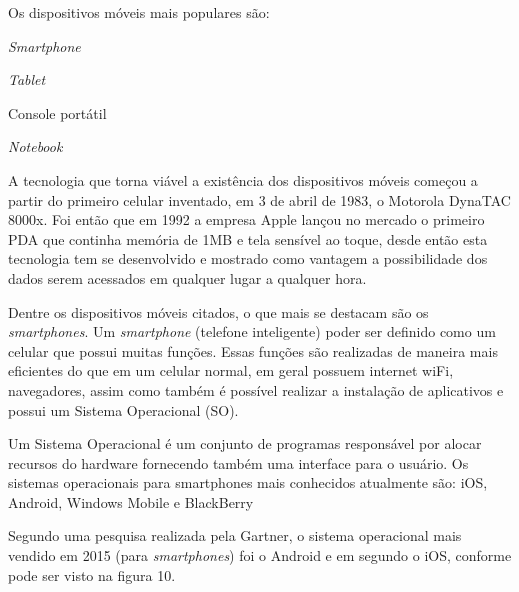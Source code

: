 Os dispositivos móveis mais populares são:

\begin{alineascomponto}
 
\item \textit{Smartphone}
\item \textit {Tablet}
\item Console portátil
\item \textit {Notebook}

	\end{alineascomponto}
	\cite{mov}

A tecnologia que torna viável a existência dos dispositivos móveis começou a partir do primeiro celular inventado, em 3 de abril de 1983, o Motorola DynaTAC 8000x. Foi então que em 1992 a empresa Apple lançou no mercado o primeiro PDA que continha memória de 1MB e tela sensível ao toque, desde então esta tecnologia tem se desenvolvido e mostrado como vantagem  a possibilidade dos dados serem acessados em qualquer lugar a qualquer hora. \cite{1cel}

Dentre os dispositivos móveis citados, o que mais se destacam são os \textit{smartphones}. Um \textit{smartphone} (telefone inteligente) poder ser definido como um celular que possui muitas funções. Essas funções são realizadas de maneira mais eficientes do que em um celular normal, em geral possuem internet wiFi, navegadores, assim como também é possível realizar a instalação de aplicativos e possui um Sistema Operacional (SO). \cite{smar} 

Um Sistema Operacional é um conjunto de programas responsável por alocar recursos do hardware fornecendo também uma interface para o usuário. Os sistemas operacionais para smartphones mais conhecidos atualmente são: iOS, Android, Windows Mobile e BlackBerry \cite{oqsmar}

Segundo uma pesquisa realizada pela Gartner, o sistema operacional mais vendido em 2015 (para \textit{smartphones}) foi o Android e em segundo o iOS, conforme pode ser visto na figura 10. \cite{gar}
\begin{figure}[h!]
		\centering
	\end{figure}

